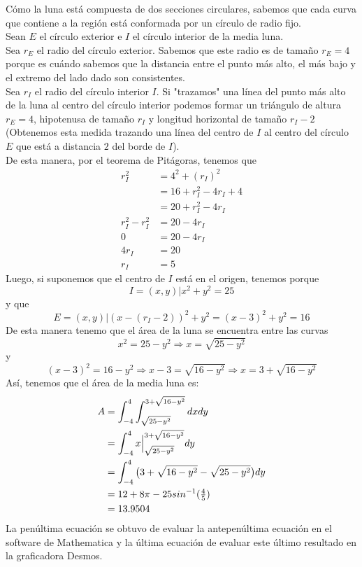 \documentclass[11pt]{report}
\begin{document}
Cómo la luna está compuesta de dos secciones circulares, sabemos que cada curva que contiene
a la región está conformada por un círculo de radio fijo.\\
Sean $E$ el círculo exterior e $I$ el círculo interior de la media luna.\\
Sea $r_E$ el radio del círculo exterior. Sabemos que este radio es de tamaño $r_E=4$ porque es cuándo
sabemos que la distancia entre el punto más alto, el más bajo y el extremo del lado dado son
consistentes. \\
Sea $r_I$ el radio del círculo interior $I$. Si "trazamos" una línea del punto más alto de la luna
al centro del círculo interior podemos formar un triángulo de altura $r_E=4$, hipotenusa de
tamaño $r_I$ y longitud horizontal de tamaño $r_I-2$ (Obtenemos esta medida trazando una línea del
centro de $I$ al centro del círculo $E$ que está a distancia $2$ del borde de $I$).\\
De esta manera, por el teorema de Pitágoras, tenemos que
\begin{equation}
	\begin{split}
		r_I^2	    &=4^2+(r_I)^2\\
			 	    &=16+r_I^2-4r_I+4\\
			 	    &=20+r_I^2-4r_I\\
		r_I^2-r_I^2 &=20-4r_I\\
		0 			&=20-4r_I\\
		4r_I		&=20\\
		r_I			&=5
	\end{split}
\end{equation}
Luego, si suponemos que el centro de $I$ está en el origen, tenemos porque
$$I={(x,y)|x^2+y^2=25}$$
y que
$$E={(x,y)|(x-(r_I-2))^2+ y^2=(x-3)^2+y^2=16}$$
De esta manera tenemo que el área de la luna se encuentra entre las curvas
$$x^2=25-y^2 \Rightarrow x=\sqrt{25-y^2}$$
y
$$(x-3)^2=16-y^2\Rightarrow x-3=\sqrt{16-y^2}\Rightarrow x=3+\sqrt{16-y^2}$$
Así, tenemos que el área de la media luna es:
\begin{equation}
	\begin{split}
		A&=\int_{-4}^4\int_{\sqrt{25-y^2}}^{3+\sqrt{16-y^2}}dxdy\\
		 &=\int_{-4}^4x\Big|_{\sqrt{25-y^2}}^{3+\sqrt{16-y^2}}dy\\
		 &=\int_{-4}^4\big( 3+\sqrt{16-y^2}-\sqrt{25-y^2} \big)dy\\
		 &=12+8\pi-25sin^{-1}(\tfrac{4}{5})\\
		 &=13.9504 \\
	\end{split}
\end{equation}
La penúltima ecuación se obtuvo de evaluar la antepenúltima ecuación en el software
de Mathematica y la última ecuación de evaluar este último resultado en la graficadora Desmos.
\end{document}
